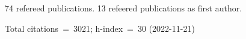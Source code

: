 74 refereed publications. 13 refeered publications as first author.

Total citations~=~3021; h-index~=~30 (2022-11-21)